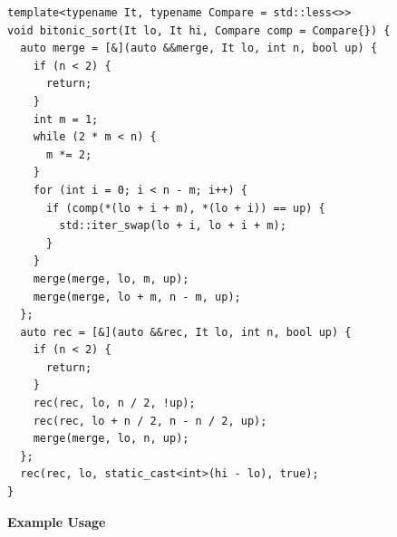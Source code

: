 \begin{lstlisting}[style=cpp]
template<typename It, typename Compare = std::less<>>
void bitonic_sort(It lo, It hi, Compare comp = Compare{}) {
  auto merge = [&](auto &&merge, It lo, int n, bool up) {
    if (n < 2) {
      return;
    }
    int m = 1;
    while (2 * m < n) {
      m *= 2;
    }
    for (int i = 0; i < n - m; i++) {
      if (comp(*(lo + i + m), *(lo + i)) == up) {
        std::iter_swap(lo + i, lo + i + m);
      }
    }
    merge(merge, lo, m, up);
    merge(merge, lo + m, n - m, up);
  };
  auto rec = [&](auto &&rec, It lo, int n, bool up) {
    if (n < 2) {
      return;
    }
    rec(rec, lo, n / 2, !up);
    rec(rec, lo + n / 2, n - n / 2, up);
    merge(merge, lo, n, up);
  };
  rec(rec, lo, static_cast<int>(hi - lo), true);
}
\end{lstlisting}
\textbf{Example Usage}\par
